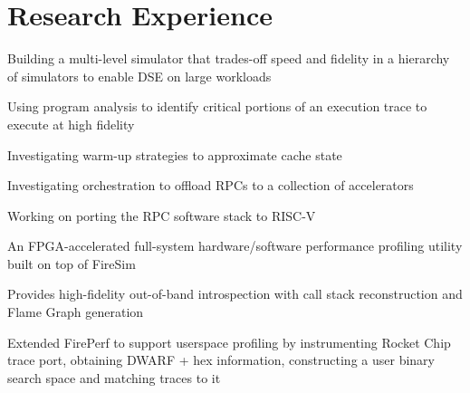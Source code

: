 \documentclass[]{deedy-resume-openfont}
\begin{document}
\section{Research Experience}



\vspace{\topsep} %

{\normalsize
\begin{tightemize}
\item Building a multi-level simulator that trades-off speed and fidelity in a hierarchy of simulators to enable DSE on large workloads
\item Using program analysis to identify critical portions of an execution trace to execute at high fidelity
\item Investigating warm-up strategies to approximate cache state 
\end{tightemize}
}


{\normalsize
\begin{tightemize}
\item Investigating orchestration to offload RPCs to a collection of accelerators
\item Working on porting the RPC software stack to RISC-V
\end{tightemize}
}


\begin{tightemize}
{\normalsize
\item An FPGA-accelerated full-system hardware/software performance profiling utility built on top of FireSim
\item Provides high-fidelity out-of-band introspection with call stack reconstruction and Flame Graph generation
\item Extended FirePerf to support userspace profiling by instrumenting Rocket Chip trace port, obtaining DWARF + hex information, constructing a user binary search space and matching traces to it
}
\end{tightemize}
\end{document}
